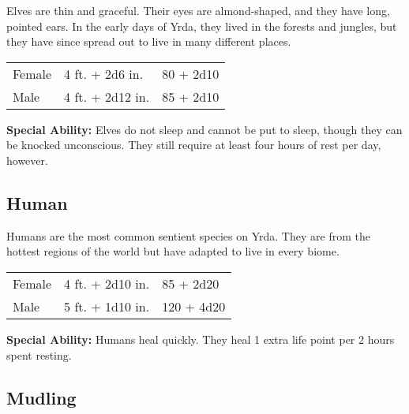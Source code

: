 \begin{multicols}{2}
Elves are thin and graceful. Their eyes are almond-shaped, and they
have long, pointed ears. In the early days of Yrda, they
lived in the forests and jungles, but they have since spread out to
live in many different places.

\begin{center}
{
\begin{xtabular}{|l|l|l|}
Female & 4 ft. + 2d6 in. & 80 + 2d10 \\
Male & 4 ft. + 2d12 in. & 85 + 2d10 \\
\hline
\end{xtabular}
}
\end{center}

\textbf{Special Ability:} Elves do not sleep and cannot be put to sleep, though they can be knocked unconscious. They still require at least four hours of rest per day, however.

\subsection{Human}

Humans are the most common sentient species on Yrda. They
are from the hottest regions of the world but have adapted to live in
every biome.

\begin{center}
{
\begin{xtabular}{|l|l|l|}
Female & 4 ft. + 2d10 in. & 85 + 2d20 \\
Male & 5 ft. + 1d10 in. & 120 + 4d20 \\
\hline
\end{xtabular}
}
\end{center}

\textbf{Special Ability:} Humans heal quickly. They heal 1 extra life point per 2 hours spent resting.

\subsection{Mudling}


\end{multicols}
